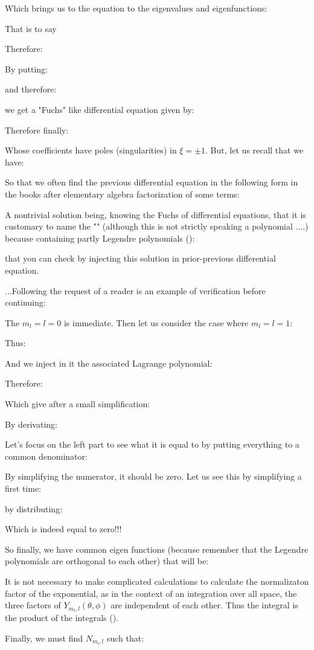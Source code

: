	Which brings us to the equation to the eigenvalues and eigenfunctions:
	
	That is to say
	
	Therefore:
	
	By putting:
	
	and therefore:
	
	we get a "Fuchs" like differential equation given by:
	
	Therefore finally:
	
	Whose coefficients have poles (singularities) in $\xi=\pm 1$. But, let us recall that we have:
	
	So that we often find the previous differential equation in the following form in the books after elementary algebra factorization of some terms:
	
	A nontrivial solution being, knowing the Fuchs of differential equations, that it is customary to name the "" (although this is not strictly speaking a polynomial ....) because containing partly Legendre polynomials ():
	
	that you can check by injecting this solution in prior-previous differential equation.
	
	...Following the request of a reader is an example of verification before continuing:
	
	The $m_l=l=0$ is immediate. Then let us consider the case where $m_l=l=1$:
	
	Thus:
	
	And we inject in it the associated Lagrange polynomial:
	
	Therefore:
	
	Which give after a small simplification:
	
	By derivating:
	
	Let's focus on the left part to see what it is equal to by putting everything to a common denominator:
	
	By simplifying the numerator, it should be zero. Let us see this by simplifying a first time:
	
	by distributing:
	
	Which is indeed equal to zero!!!

	So finally, we have common eigen functions (because remember that the Legendre polynomials are orthogonal to each other) that will be:
	 
	\begin{tcolorbox}[title=Remark,colframe=black,arc=10pt]
	It is not necessary to make complicated calculations to calculate the normalizaton factor of the exponential, as in the context of an integration over all space, the three factors of $Y_{m_l,l}(\theta,\phi)$ are independent of each other. Thus the integral is the product of the integrals ().
	\end{tcolorbox}
	Finally, we must find $N_{m_l,l}$ such that:
	

